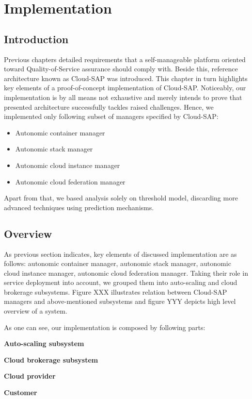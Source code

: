 \chapter{Implementation}


\section{Introduction}
Previous chapters detailed requirements that a self-manageable platform oriented toward Quality-of-Service assurance should comply with. Beside this, reference architecture known as Cloud-SAP was introduced. This chapter in turn highlights key elements of a proof-of-concept implementation of Cloud-SAP. Noticeably, our implementation is by all means not exhaustive and merely intends to prove that presented architecture successfully tackles raised challenges. Hence, we implemented only following subset of managers specified by Cloud-SAP:
\begin{itemize}
  \item Autonomic container manager
  \item Autonomic stack manager
  \item Autonomic cloud instance manager
  \item Autonomic cloud federation manager
\end{itemize}

Apart from that, we based analysis solely on threshold model, discarding more advanced techniques using prediction mechanisms.

\section{Overview}
As previous section indicates, key elements of discussed implementation are as follows: autonomic container manager, autonomic stack manager, autonomic cloud instance manager, autonomic cloud federation manager. Taking their role in service deployment into account, we grouped them into auto-scaling and cloud brokerage subsystems. Figure XXX illustrates relation between Cloud-SAP managers and above-mentioned subsystems and figure YYY depicts high level overview of a system.

As one can see, our implementation is composed by following parts:
\begin{asparaenum}
 \item[\textbf{Auto-scaling subsystem}]

 \item[\textbf{Cloud brokerage subsystem}] 
 
 \item[\textbf{Cloud provider}] 
 
 \item[\textbf{Customer}] 
\end{asparaenum}

